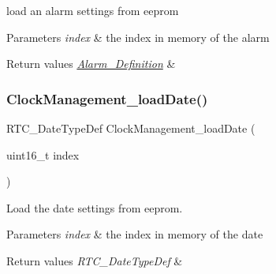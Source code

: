 load an alarm settings from eeprom 


\begin{DoxyParams}{Parameters}
{\em index} & the index in memory of the alarm \\
\hline
\end{DoxyParams}

\begin{DoxyRetVals}{Return values}
{\em \hyperlink{struct_alarm___definition}{Alarm\+\_\+\+Definition}} & \\
\hline
\end{DoxyRetVals}
\mbox{\label{group___clock___management___eeprom_ga7bc7fe03cb9b82c9d7bc38ece99b7eb1}} 
\subsubsection{\texorpdfstring{Clock\+Management\+\_\+load\+Date()}{ClockManagement\_loadDate()}}
{\footnotesize\ttfamily R\+T\+C\+\_\+\+Date\+Type\+Def Clock\+Management\+\_\+load\+Date (\begin{DoxyParamCaption}\item[{uint16\+\_\+t}]{index }\end{DoxyParamCaption})}



Load the date settings from eeprom. 


\begin{DoxyParams}{Parameters}
{\em index} & the index in memory of the date \\
\hline
\end{DoxyParams}

\begin{DoxyRetVals}{Return values}
{\em R\+T\+C\+\_\+\+Date\+Type\+Def} & \\
\hline
\end{DoxyRetVals}
\mbox{\label{group___clock___management___eeprom_gab71fe17a64f012980cc619f7d3d55887}} 

